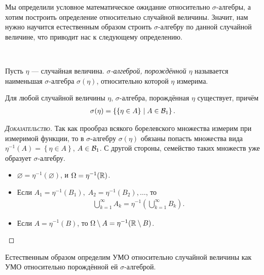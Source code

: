 \documentclass[../main.tex]{subfiles}
\begin{document}
Мы определили условное математическое ожидание относительно $ \sigma $-алгебры, а хотим построить определение относительно случайной величины. Значит, нам нужно научится естественным образом строить $ \sigma $-алгебру по данной случайной величине, что приводит нас к следующему определению.

\begin{df}\

 Пусть $ \eta $ --- случайная величина.
 \textit{$ \sigma $-алгеброй, порождённой $ \eta $} называется наименьшая $ \sigma $-алгебра $ \sigma(\eta) $, относительно которой $ \eta $ измерима.
\end{df}
\begin{prop}
 Для любой случайной величины $ \eta $, $ \sigma $-алгебра, порождённая $ \eta $ существует, причём
 \begin{align*}
  \sigma(\eta) = \left\{ \left\{ \eta \in A \right\} \mid A \in \mathcal B_1 \right\}.
 \end{align*}
\end{prop}
\begin{proof}[\normalfont\textsc{Доказательство}]
 Так как прообраз всякого борелевского множества измерим при измеримой функции, то в $ \sigma $-алгебру $ \sigma(\eta) $ обязаны попасть множества вида $ \eta^{-1}(A) = \left\{ \eta \in A \right\} $, $ A \in \mathcal B_1 $. С другой стороны, семейство таких множеств уже образует $ \sigma $-алгебру.
 \begin{itemize}
  \item $ \varnothing = \eta^{-1}(\varnothing) $, и $ \Omega = \eta^{-1}(\mathbb{R}) $.
  \item Если $ A_1 = \eta^{-1}(B_1),\; A_2 = \eta^{-1}(B_2), \ldots $, то
   \begin{align*}
    \bigcup_{k=1}^{\infty} A_k = \eta^{-1} \left( \bigcup_{k=1}^{\infty} B_k \right).
   \end{align*}
  \item Если $ A = \eta^{-1}(B) $, то $ \Omega \setminus A = \eta^{-1}(\mathbb{R} \setminus B) $.
 \end{itemize}
\end{proof}

Естественным образом определим УМО относительно случайной величины как УМО относительно порождённой ей $ \sigma $-алгеброй.
\end{document}
